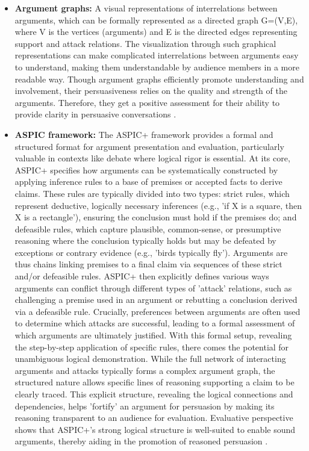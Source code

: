 \documentclass[conference]{IEEEtran}
\begin{document}
\begin{itemize}
    \item \textbf{Argument graphs:} A visual representations of interrelations between arguments, which can be formally represented as a directed graph G=(V,E), where V is the vertices (arguments) and E is the directed edges representing support and attack relations. The visualization through such graphical representations can make complicated interrelations between arguments easy to understand, making them understandable by audience members in a more readable way. Though argument graphs efficiently promote understanding and involvement, their persuasiveness relies on the quality and strength of the arguments. Therefore, they get a positive assessment for their ability to provide clarity in persuasive conversations \cite{chalaguine2020persuasive}\cite{engelmann2022argumentation}.

    \item \textbf{ASPIC framework:} The ASPIC+ framework provides a formal and structured format for argument presentation and evaluation, particularly valuable in contexts like debate where logical rigor is essential. At its core, ASPIC+ specifies how arguments can be systematically constructed by applying inference rules to a base of premises or accepted facts to derive claims. These rules are typically divided into two types: strict rules, which represent deductive, logically necessary inferences (e.g., 'if X is a square, then X is a rectangle'), ensuring the conclusion must hold if the premises do; and defeasible rules, which capture plausible, common-sense, or presumptive reasoning where the conclusion typically holds but may be defeated by exceptions or contrary evidence (e.g., 'birds typically fly'). Arguments are thus chains linking premises to a final claim via sequences of these strict and/or defeasible rules. ASPIC+ then explicitly defines various ways arguments can conflict through different types of 'attack' relations, such as challenging a premise used in an argument or rebutting a conclusion derived via a defeasible rule. Crucially, preferences between arguments are often used to determine which attacks are successful, leading to a formal assessment of which arguments are ultimately justified. With this formal setup, revealing the step-by-step application of specific rules, there comes the potential for unambiguous logical demonstration. While the full network of interacting arguments and attacks typically forms a complex argument graph, the structured nature allows specific lines of reasoning supporting a claim to be clearly traced. This explicit structure, revealing the logical connections and dependencies, helps 'fortify' an argument for persuasion by making its reasoning transparent to an audience for evaluation. Evaluative perspective shows that ASPIC+'s strong logical structure is well-suited to enable sound arguments, thereby aiding in the promotion of reasoned persuasion \cite{engelmann2022argumentation}.


\end{itemize}
\end{document}
